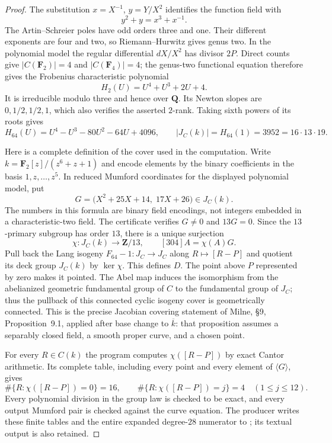 \documentclass[11pt,a4paper]{article}
\newcommand{\Z}{\mathbf Z}
\newcommand{\Q}{\mathbf Q}
\newcommand{\F}{\mathbf F}
\begin{document}
\begin{proof}
The substitution $x=X^{-1}$, $y=Y/X^2$ identifies the
function field with
\[
 y^2+y=x^3+x^{-1}.
\]
The Artin--Schreier poles have odd orders three and one.
Their different exponents are four and two, so
Riemann--Hurwitz gives genus two. In the polynomial model
the regular differential $dX/X^2$ has divisor $2P$.
Direct counts give $|C(\F_2)|=4$ and $|C(\F_4)|=4$;
the genus-two functional equation therefore gives the
Frobenius characteristic polynomial
\[
 H_2(U)=U^4+U^3+2U+4.
\]
It is irreducible modulo three and hence over $\Q$.
Its Newton slopes are $0,1/2,1/2,1$, which also verifies
the asserted $2$-rank. Taking sixth powers of its roots
gives
\[
 H_{64}(U)=U^4-U^3-80U^2-64U+4096,
 \qquad |J_C(k)|=H_{64}(1)=3952=16\cdot13\cdot19.
\]

Here is a complete definition of the cover used in the
computation. Write $k=\F_2[z]/(z^6+z+1)$ and encode
elements by the binary coefficients in the basis
$1,z,\ldots,z^5$. In reduced Mumford coordinates for the
displayed polynomial model, put
\[
 G=\bigl(X^2+25X+14,\;17X+26\bigr)\in J_C(k).
\]
The numbers in this formula are binary field encodings,
not integers embedded in a characteristic-two field.
The certificate verifies $G\ne0$ and $13G=0$.
Since the $13$-primary subgroup has order $13$, there is
a unique surjection
\[
 \chi:J_C(k)\longrightarrow\Z/13,
 \qquad [304]A=\chi(A)G.
\]
Pull back the Lang isogeny $F_{64}-1:J_C\to J_C$
along $R\mapsto[R-P]$ and quotient its deck group
$J_C(k)$ by $\ker\chi$. This defines $D$. The point
above $P$ represented by zero makes it pointed. The
Abel map induces the isomorphism from the abelianized
geometric fundamental group of $C$ to the fundamental
group of $J_C$; thus the pullback of this connected
cyclic isogeny cover is geometrically connected.
This is the precise Jacobian covering statement of
Milne, \S9, Proposition~9.1, applied after base change
to $\overline{k}$: that proposition assumes a separably
closed field, a smooth proper curve, and a chosen point.
\citep[\S9, Proposition~9.1]{MilneJac}

For every $R\in C(k)$ the program computes
$\chi([R-P])$ by exact Cantor arithmetic. Its complete
table, including every point and every element of
$\langle G\rangle$, gives
\[
 \#\{R:\chi([R-P])=0\}=16,
 \qquad
 \#\{R:\chi([R-P])=j\}=4
 \quad(1\le j\le12).
\]
Every polynomial division in the group law is checked
to be exact, and every output Mumford pair is checked
against the curve equation. The producer
 writes these finite
tables and the entire expanded degree-$28$ numerator to
; its textual
output is also retained.


\end{proof}
\end{document}
